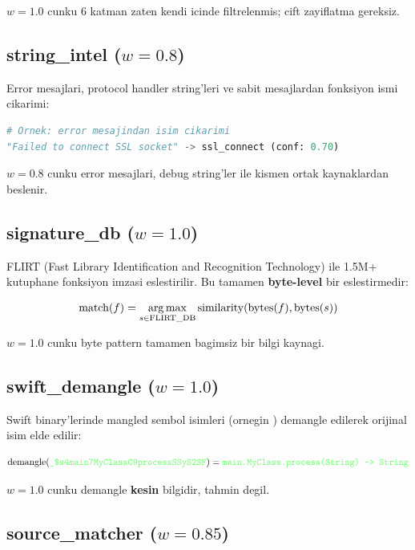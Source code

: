 $w = 1.0$ cunku 6 katman zaten kendi icinde filtrelenmis; cift zayiflatma gereksiz.

\subsection{string\_intel ($w = 0.8$)}

Error mesajlari, protocol handler string'leri ve sabit mesajlardan fonksiyon ismi cikarimi:

\begin{lstlisting}[language=Python]
# Ornek: error mesajindan isim cikarimi
"Failed to connect SSL socket" -> ssl_connect (conf: 0.70)
\end{lstlisting}

$w = 0.8$ cunku error mesajlari, debug string'ler ile kismen ortak kaynaklardan beslenir.

\subsection{signature\_db ($w = 1.0$)}

FLIRT (Fast Library Identification and Recognition Technology) ile 1.5M+ kutuphane fonksiyon imzasi eslestirilir. Bu tamamen \textbf{byte-level} bir eslestirmedir:

\begin{equation}
\text{match}(f) = \operatorname*{arg\,max}_{s \in \text{FLIRT\_DB}} \text{similarity}(\text{bytes}(f), \text{bytes}(s))
\end{equation}

$w = 1.0$ cunku byte pattern tamamen bagimsiz bir bilgi kaynagi.

\subsection{swift\_demangle ($w = 1.0$)}

Swift binary'lerinde mangled sembol isimleri (ornegin ) demangle edilerek orijinal isim elde edilir:

\begin{equation}
\text{demangle}(\code{\_\$s4main7MyClassC9processSSyS2SF}) = \code{main.MyClass.process(String) -> String}
\end{equation}

$w = 1.0$ cunku demangle \textbf{kesin} bilgidir, tahmin degil.

\subsection{source\_matcher ($w = 0.85$)}

